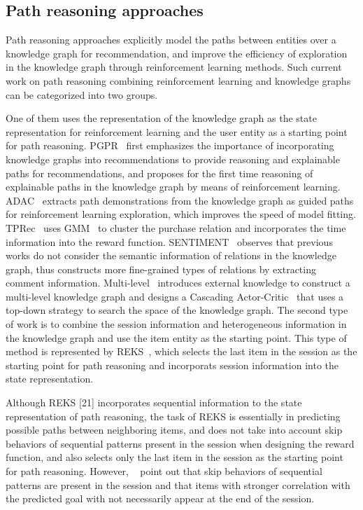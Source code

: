 \documentclass[10pt,journal,compsoc]{IEEEtran}
\begin{document}
\subsection{Path reasoning approaches}
Path reasoning approaches explicitly model the paths between entities over a knowledge graph for recommendation, and improve the efficiency of exploration in the knowledge graph through reinforcement learning methods. Such current work on path reasoning combining reinforcement learning and knowledge graphs can be categorized into two groups.

One of them uses the representation of the knowledge graph as the state representation for reinforcement learning and the user entity as a starting point for path reasoning. 
PGPR~\cite{rl_pgpr} first emphasizes the importance of incorporating knowledge graphs into recommendations to provide reasoning and explainable paths for recommendations, and proposes for the first time reasoning of explainable paths in the knowledge graph by means of reinforcement learning. 
ADAC~\cite{rl_adac} extracts path demonstrations from the knowledge graph as guided paths for reinforcement learning exploration, which improves the speed of model fitting.
TPRec~\cite{rl_time} uses GMM~\cite{ml_gmm} to cluster the purchase relation and incorporates the time information into the reward function. 
SENTIMENT~\cite{rl_sentiment} observes that previous works do not consider the semantic information of relations in the knowledge graph, thus constructs more fine-grained types of relations by extracting comment information. 
Multi-level~\cite{rl_multi} introduces external knowledge to construct a multi-level knowledge graph and designs a Cascading Actor-Critic~\cite{haarnoja2018soft,afsar2022reinforcement} that uses a top-down strategy to search the space of the knowledge graph.
The second type of work is to combine the session information and heterogeneous information in the knowledge graph and use the item entity as the starting point. 
This type of method is represented by REKS~\cite{rs_reks}, which selects the last item in the session as the starting point for path reasoning and incorporats session information into the state representation.

Although REKS [21] incorporates sequential information to the state representation of path reasoning, the task of REKS is essentially in predicting possible paths between neighboring items, and does not take into account skip behaviors of sequential patterns present in the session when designing the reward function, and also selects only the last item in the session as the starting point for path reasoning.
However, ~\cite{rs_narm,rs_caser} point out that skip behaviors of sequential patterns are present in the session and that items with stronger correlation with the predicted goal with not necessarily appear at the end of the session.
\end{document}
